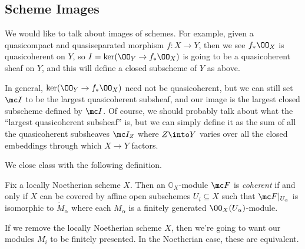 \documentclass[../notes.tex]{subfiles}
\begin{document}
\subsection{Scheme Images}
We would like to talk about images of schemes. For example, given a quasicompact and quasiseparated morphism $f\colon X\to Y$, then we see $f_*\OO_X$ is quasicoherent on $Y$, so $I=\ker(\OO_Y\to f_*\OO_X)$ is going to be a quasicoherent sheaf on $Y$, and this will define a closed subscheme of $Y$ as above.

In general, $\ker(\OO_Y\to f_*\OO_X)$ need not be quasicoherent, but we can still set $\mc I$ to be the largest quasicoherent subsheaf, and our image is the largest closed subscheme defined by $\mc I$. Of course, we should probably talk about what the ``largest quasicoherent subsheaf'' is, but we can simply define it as the sum of all the quasicoherent subsheaves $\mc I_Z$ where $Z\into Y$ varies over all the closed embeddings through which $X\to Y$ factors.

We close class with the following definition.
\begin{definition}
	Fix a locally Noetherian scheme $X$. Then an $\mathbb O_X$-module $\mc F$ is \textit{coherent} if and only if $X$ can be covered by affine open subschemes $U_i\subseteq X$ such that $\mc F|_{U_\alpha}$ is isomorphic to $\widetilde M_\alpha$ where each $M_\alpha$ is a finitely generated $\OO_X(U_\alpha)$-module.
\end{definition}
\begin{remark}
	If we remove the locally Noetherian scheme $X$, then we're going to want our modules $M_i$ to be finitely presented. In the Noetherian case, these are equivalent.
\end{remark}
\end{document}

